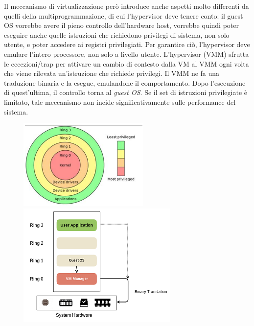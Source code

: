 \documentclass{article}
\begin{document}
Il meccanismo di virtualizzazione però introduce anche aspetti molto differenti da quelli della multiprogrammazione, di cui l’hypervisor deve tenere conto: il guest OS vorrebbe avere il pieno controllo dell’hardware host, vorrebbe quindi poter eseguire anche quelle istruzioni che richiedono privilegi di sistema, non solo utente, e poter accedere ai registri privilegiati.
Per garantire ciò, l’hypervisor deve emulare l’intero processore, non solo a livello utente.
L’hypervisor (VMM) sfrutta le eccezioni/trap per attivare un cambio di contesto dalla VM al VMM ogni volta che viene rilevata un’istruzione che richiede privilegi. 
Il VMM ne fa una traduzione binaria e la esegue, emulandone il comportamento.
Dopo l’esecuzione di quest’ultima, il controllo torna al \textit{guest OS}.
Se il set di istruzioni privilegiate è limitato, tale meccanismo non incide significativamente sulle performance del sistema.
\begin{figure}[H]
    \centering
    \includegraphics[scale=0.8]{img/Virt_tech/11.png}   
    \includegraphics[scale=0.8]{img/Virt_tech/12.png}
    \caption{}
\end{figure}\noindent
\end{document}
